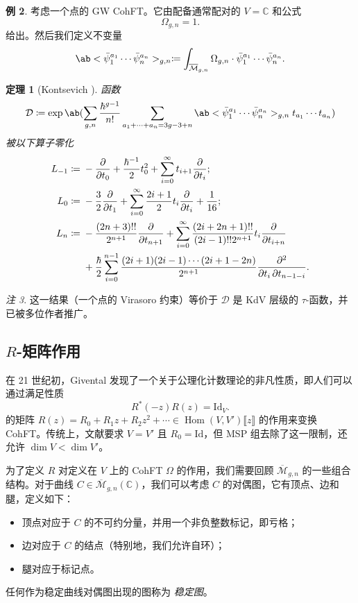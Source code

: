 \documentclass{amsart}
\newtheorem{thm}{定理}[section]
\theoremstyle{definition}
\newtheorem{exm}[thm]{例}
\theoremstyle{remark}
\newtheorem{rmk}[thm]{注}
\theoremstyle{plain}
\theoremstyle{definition}
\theoremstyle{remark}
\newcommand{\C}{\mathbb{C}}
\newcommand{\Mbar}{\overline{\mathcal{M}}}
\newcommand{\mc}[1]{\mathcal{#1}}
\newcommand{\mr}[1]{\mathrm{#1}}
\newcommand{\1}{\mathbf{1}}
\newcommand{\2}{\mathbf{2}}
\newcommand{\3}{\mathbf{3}}
\newcommand{\ps}[1]{\llbracket #1 \rrbracket}
\DeclareMathOperator{\Hom}{Hom}
\begin{document}
\begin{exm}
    考虑一个点的 GW CohFT。它由配备通常配对的 $V = \C$ 和公式
    \[ \Omega_{g,n} = 1. \]
    给出。然后我们定义不变量
    \[ \ab<\bar{\psi}_1^{a_1} \cdots \bar{\psi}_n^{a_n}>_{g,n} \coloneqq \int_{\Mbar_{g,n}} \Omega_{g,n} \cdot \bar{\psi}_1^{a_1} \cdots \bar{\psi}_n^{a_n}. \]
    \begin{thm}[Kontsevich {\cite{Kontsevich1992}}]
        函数
        \[ \mc{D} \coloneqq \exp \ab(\sum_{g,n} \frac{\hbar^{g-1}}{n!}\sum_{a_1 + \cdots + a_n = 3g-3+n} \ab<\bar{\psi}_1^{a_1} \cdots \bar{\psi}_n^{a_n}>_{g,n} t_{a_1}\cdots t_{a_n}) \]
        被以下算子零化
        \begin{align*}
            L_{-1} \coloneqq{}& -\pdv{}{t_0} + \frac{\hbar^{-1}}{2} t_0^2 + \sum_{i=0}^{\infty} t_{i+1} \pdv{}{t_i};\\
            L_0 \coloneqq{}& -\frac{3}{2} \pdv{}{t_1} + \sum_{i=0}^{\infty} \frac{2i+1}{2} t_i \pdv{}{t_i} + \frac{1}{16};\\
            L_n \coloneqq{}& -\frac{(2n+3)!!}{2^{n+1}} \pdv{}{t_{n+1}} + \sum_{i=0}^{\infty} \frac{(2i+2n+1)!!}{(2i-1)!! 2^{n+1}} t_i \pdv{}{t_{i+n}} \\
            &+ \frac{\hbar}{2} \sum_{i=0}^{n-1} \frac{(2i+1) (2i-1) \cdots (2i+1-2n)}{2^{n+1}} \pdv{}{t_i,t_{n-1-i}}.
        \end{align*}
    \end{thm}
\end{exm}

\begin{rmk}
    这一结果（一个点的 Virasoro 约束）等价于 $\mc{D}$ 是 KdV 层级的 $\tau$-函数，并已被多位作者推广。
\end{rmk}



\subsection{$R$-矩阵作用}%
\label{sub:R-matrix action}

在 21 世纪初，Givental 发现了一个关于公理化计数理论的非凡性质，即人们可以通过满足性质
\[ R^*(-z) R(z) = \mr{Id}_V. \]
的矩阵 $R(z) = R_0 + R_1 z + R_2 z^2 + \cdots \in \Hom(V, V')\ps{z}$ 的作用来变换 CohFT。传统上，文献要求 $V = V'$ 且 $R_0 = \mr{Id}$，但 MSP 组去除了这一限制，还允许 $\dim V < \dim V'$。

为了定义 $R$ 对定义在 $V$ 上的 CohFT $\Omega$ 的作用，我们需要回顾 $\Mbar_{g,n}$ 的一些组合结构。对于曲线 $C\in \Mbar_{g,n}(\C)$，我们可以考虑 $C$ 的对偶图，它有顶点、边和腿，定义如下：
\begin{itemize}
    \item 顶点对应于 $C$ 的不可约分量，并用一个非负整数标记，即亏格；
    \item 边对应于 $C$ 的结点（特别地，我们允许自环）；
    \item 腿对应于标记点。
\end{itemize}
任何作为稳定曲线对偶图出现的图称为 \textit{稳定图}。
\end{document}
